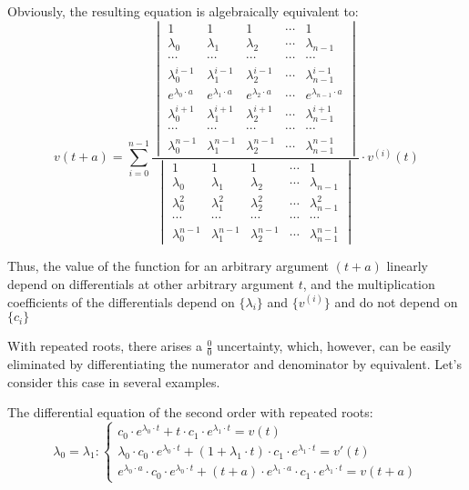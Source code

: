 \documentclass[a4paper, 11pt, oneside]{book}
\begin{document}
Obviously, the resulting equation is algebraically equivalent to:
\begin{equation}\label{eq:monolinear-equation-solution-similar}
  v(t + a) = \sum_{i=0}^{n-1}
  \frac{
  \begin{vmatrix}
    1 & 1 & 1 & \cdots & 1 \\
    \lambda_0 & \lambda_1 & \lambda_2 & \cdots & \lambda_{n-1} \\
    \cdots & \cdots & \cdots & \cdots & \cdots \\
    \lambda_0^{i-1} & \lambda_1^{i-1} & \lambda_2^{i-1} & \cdots & \lambda_{n-1}^{i-1} \\
    e^{\lambda_0 \cdot a} & e^{\lambda_1 \cdot a} & e^{\lambda_2 \cdot a} & \cdots & e^{\lambda_{n-1} \cdot a} \\
    \lambda_0^{i+1} & \lambda_1^{i+1} & \lambda_2^{i+1} & \cdots & \lambda_{n-1}^{i+1} \\
    \cdots & \cdots & \cdots & \cdots & \cdots \\
    \lambda_0^{n-1} & \lambda_1^{n-1} & \lambda_2^{n-1} & \cdots & \lambda_{n-1}^{n-1}
  \end{vmatrix}
  }{
  \begin{vmatrix}
    1 & 1 & 1 & \cdots & 1 \\
    \lambda_0 & \lambda_1 & \lambda_2 & \cdots & \lambda_{n-1} \\
    \lambda_0^2 & \lambda_1^2 & \lambda_2^2 & \cdots & \lambda_{n-1}^2 \\
    \cdots & \cdots & \cdots & \cdots & \cdots \\
    \lambda_0^{n-1} & \lambda_1^{n-1} & \lambda_2^{n-1} & \cdots & \lambda_{n-1}^{n-1}
  \end{vmatrix}
  }
  \cdot v^{(i)}(t)
\end{equation}

Thus, the value of the function for an arbitrary argument $(t + a)$ linearly depend on differentials at other arbitrary argument $t$, and the multiplication coefficients of the differentials depend on $\{\lambda_i\}$ and $\{v^{(i)}\}$ and do not depend on $\{c_i\}$

With repeated roots, there arises a $\frac{0}{0}$ uncertainty, which, however, can be easily eliminated by differentiating the numerator and denominator by equivalent. Let's consider this case in several examples.

The differential equation of the second order with repeated roots:
\begin{equation}\label{eq:monolinear-equation-2order-rep-roots}
  \lambda_0 = \lambda_1:
  \begin{cases}
    c_0 \cdot e^{\lambda_0 \cdot t} + t \cdot c_1 \cdot e^{\lambda_1 \cdot t} = v(t) \\
    \lambda_0 \cdot c_0 \cdot e^{\lambda_0 \cdot t} + (1 + \lambda_1 \cdot t) \cdot c_1 \cdot e^{\lambda_1 \cdot t} = v'(t) \\
    e^{\lambda_0 \cdot a} \cdot c_0 \cdot e^{\lambda_0 \cdot t} + (t + a) \cdot e^{\lambda_1 \cdot a} \cdot c_1 \cdot e^{\lambda_1 \cdot t} = v(t + a)
  \end{cases}
\end{equation}
\end{document}

